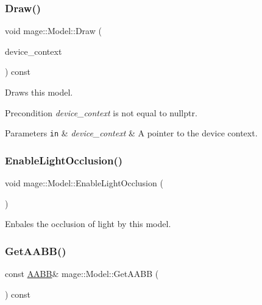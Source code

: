 \subsubsection{\texorpdfstring{Draw()}{Draw()}}
{\footnotesize\ttfamily void mage\+::\+Model\+::\+Draw (\begin{DoxyParamCaption}\item[{I\+D3\+D11\+Device\+Context4 $\ast$}]{device\+\_\+context }\end{DoxyParamCaption}) const\hspace{0.3cm}{\ttfamily [noexcept]}}

Draws this model.

\begin{DoxyPrecond}{Precondition}
{\itshape device\+\_\+context} is not equal to {\ttfamily nullptr}. 
\end{DoxyPrecond}

\begin{DoxyParams}[1]{Parameters}
\mbox{\tt in}  & {\em device\+\_\+context} & A pointer to the device context. \\
\hline
\end{DoxyParams}
\hypertarget{classmage_1_1_model_a5fd5e62a3365810d84af4cf9c202a9fa}{}\label{classmage_1_1_model_a5fd5e62a3365810d84af4cf9c202a9fa} 
\subsubsection{\texorpdfstring{Enable\+Light\+Occlusion()}{EnableLightOcclusion()}}
{\footnotesize\ttfamily void mage\+::\+Model\+::\+Enable\+Light\+Occlusion (\begin{DoxyParamCaption}{ }\end{DoxyParamCaption})\hspace{0.3cm}{\ttfamily [noexcept]}}

Enbales the occlusion of light by this model. \hypertarget{classmage_1_1_model_a07af22d1e72ffde3ad33b709a8d5c7f4}{}\label{classmage_1_1_model_a07af22d1e72ffde3ad33b709a8d5c7f4} 
\subsubsection{\texorpdfstring{Get\+A\+A\+B\+B()}{GetAABB()}}
{\footnotesize\ttfamily const \hyperlink{structmage_1_1_a_a_b_b}{A\+A\+BB}\& mage\+::\+Model\+::\+Get\+A\+A\+BB (\begin{DoxyParamCaption}{ }\end{DoxyParamCaption}) const\hspace{0.3cm}{\ttfamily [noexcept]}}

